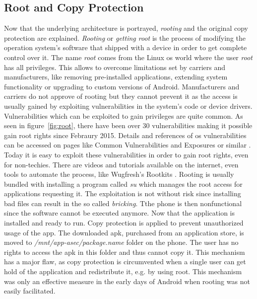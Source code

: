 \subsection{Root and Copy Protection} \label{subsection:android-copyroot}
Now that the underlying architecture is portrayed, \textit{rooting} and the original copy protection are explained.
\textit{Rooting} or \textit{getting root} is the process of modifying the operation system's software that shipped with a device in order to get complete control over it.
The name \textit{root} comes from the Linux \gls{os} world where the user \textit{root} has all privileges.
This allows to overcome limitations set by carriers and manufacturers, like removing pre-installed applications, extending system functionality or upgrading to custom versions of Android.
Manufacturers and carriers do not approve of rooting but they cannot prevent it as the access is usually gained by exploiting vulnerabilities in the system's code or device drivers.
Vulnerabilities which can be exploited to gain privileges are quite common.
As seen in figure~\ref{fig:root}, there have been over 30 vulnerabilities making it possible gain root rights since Febraury 2015.
Details and references of \gls{os} vulnerabilities can be accessed on pages like Common Vulnerabilities and Exposures or similar \cite{cveAndroidPriv} \cite{cveDetails}.
\newline
Today it is easy to exploit these vulnerabilities in order to gain root rights, even for non-techies.
There are videos and tutorials available on the internet, even tools to automate the process, like Wugfresh's Rootkits \cite{wugfresh}.
Rooting is usually bundled with installing a program called \textit{su} which manages the root access for applications requesting it.
The exploitation is not without risk since installing bad files can result in the so called \textit{bricking}.
Tthe phone is then nonfunctional since the software cannot be executed anymore.
 \cite{androidpoliceRoot}
\newline
Now that the application is installed and ready to run.
Copy protection is applied to prevent unauthorized usage of the app.
The downloaded \gls{apk}, purchased from an application store, is moved to \textit{/mnt/app-asec/package.name} folder on the phone.
The user has no rights to access the \gls{apk} in this folder and thus cannot copy it.
This mechanism has a major flaw, as copy protection is circumvented when a single user can get hold of the application and redistribute it, e.g. by using root.
This mechanism was only an effective measure in the early days of Android when rooting was not easily facilitated.
